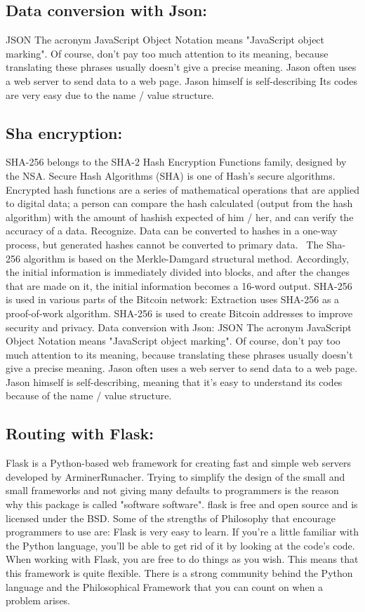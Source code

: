 \begin{flushleft}
\subsection{Data conversion with Json:
}
JSON The acronym JavaScript Object Notation means "JavaScript object marking". Of course, don't pay too much attention to its meaning, because translating these phrases usually doesn't give a precise meaning.
Jason often uses a web server to send data to a web page.
Jason himself is self-describing Its codes are very easy due to the name / value structure.

\subsection{Sha encryption:
}
SHA-256 belongs to the SHA-2 Hash Encryption Functions family, designed by the NSA. Secure Hash Algorithms (SHA) is one of Hash's secure algorithms. Encrypted hash functions are a series of mathematical operations that are applied to digital data; a person can compare the hash calculated (output from the hash algorithm) with the amount of hashish expected of him / her, and can verify the accuracy of a data. Recognize. Data can be converted to hashes in a one-way process, but generated hashes cannot be converted to primary data.
 The Sha-256 algorithm is based on the Merkle-Damgard structural method. Accordingly, the initial information is immediately divided into blocks, and after the changes that are made on it, the initial information becomes a 16-word output.
SHA-256 is used in various parts of the Bitcoin network: Extraction uses SHA-256 as a proof-of-work algorithm. SHA-256 is used to create Bitcoin addresses to improve security and privacy.
Data conversion with Json:
JSON The acronym JavaScript Object Notation means "JavaScript object marking". Of course, don't pay too much attention to its meaning, because translating these phrases usually doesn't give a precise meaning.
Jason often uses a web server to send data to a web page.
Jason himself is self-describing, meaning that it's easy to understand its codes because of the name / value structure.

\subsection{Routing with Flask:
}
Flask is a Python-based web framework for creating fast and simple web servers developed by ArminerRunacher. Trying to simplify the design of the small and small frameworks and not giving many defaults to programmers is the reason why this package is called "software software". flask is free and open source and is licensed under the BSD.
Some of the strengths of Philosophy that encourage programmers to use are:
Flask is very easy to learn. If you're a little familiar with the Python language, you'll be able to get rid of it by looking at the code's code.
When working with Flask, you are free to do things as you wish. This means that this framework is quite flexible.
There is a strong community behind the Python language and the Philosophical Framework that you can count on when a problem arises.


\end{flushleft}
